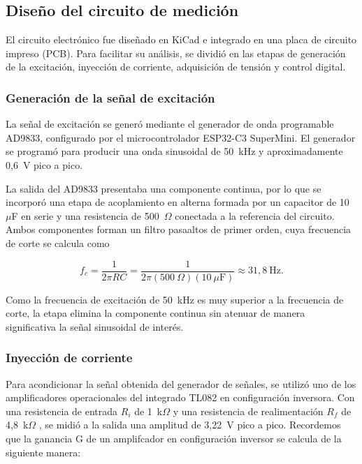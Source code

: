 \documentclass[12pt,a4paper]{article}
\begin{document}
\subsection{Diseño del circuito de medición}

El circuito electrónico fue diseñado en KiCad e integrado en una placa de circuito impreso (PCB). Para
facilitar su análisis, se dividió en las etapas de generación de la excitación, inyección de corriente,
adquisición de tensión y control digital.

\subsubsection{Generación de la señal de excitación}

La señal de excitación se generó mediante el generador de onda programable AD9833, configurado
por el microcontrolador ESP32-C3 SuperMini. El generador se programó para producir una onda 
sinusoidal de 50~kHz y aproximadamente 0,6~V pico a pico.

La salida del AD9833 presentaba una componente continua, por lo que se incorporó una etapa de
acoplamiento en alterna formada por un capacitor de 10~$\mu$F en serie y una resistencia de 500~$\Omega$
conectada a la referencia del circuito. Ambos componentes forman un filtro pasaaltos de primer orden,
cuya frecuencia de corte se calcula como

\begin{equation}
    f_c=\frac{1}{2\pi RC}
    =\frac{1}{2\pi(500~\Omega)(10~\mu\mathrm{F})}
    \approx 31{,}8~\mathrm{Hz}.
\end{equation}

Como la frecuencia de excitación de 50~kHz es muy superior a la frecuencia de corte, la etapa elimina
la componente continua sin atenuar de manera significativa la señal sinusoidal de interés.

\subsubsection{Inyección de corriente}

Para acondicionar la señal obtenida del generador de señales, se utilizó uno de los amplificadores operacionales 
del integrado TL082 en configuración inversora. Con una resistencia de entrada $R_i$ de 1~k$\Omega$ y una resistencia de
realimentación $R_f$ de 4,8~k$\Omega$ , se midió a la salida una amplitud de 3,22~V pico a pico. Recordemos que 
la ganancia G de un amplifcador en configuración inversor se calcula de la siguiente manera:
\end{document}

